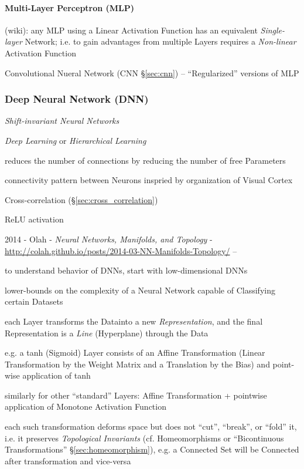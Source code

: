 \paragraph{Multi-Layer Perceptron (MLP)}\label{sec:mlp}\hfill

(wiki): any MLP using a Linear Activation Function has an equivalent
\emph{Single-layer} Network; i.e. to gain advantages from multiple Layers
requires a \emph{Non-linear} Activation Function

\fist Convolutional Nueral Network (CNN \S\ref{sec:cnn}) -- ``Regularized''
versions of MLP



\subsubsection{Deep Neural Network (DNN)}\label{sec:dnn}

\emph{Shift-invariant Neural Networks}

\emph{Deep Learning} or \emph{Hierarchical Learning}

reduces the number of connections by reducing the number of free Parameters

connectivity pattern between Neurons inspried by organization of Visual Cortex

Cross-correlation (\S\ref{sec:cross_correlation})

ReLU activation

\asterism

2014 - Olah - \emph{Neural Networks, Manifolds, and Topology} -
\url{http://colah.github.io/posts/2014-03-NN-Manifolds-Topology/} --

to understand behavior of DNNs, start with low-dimensional DNNs

lower-bounds on the complexity of a Neural Network capable of Classifying
certain Datasets

each Layer transforms the Datainto a new \emph{Representation}, and the
final Representation is a \emph{Line} (Hyperplane) through the Data

e.g. a tanh (Sigmoid) Layer consists of an Affine Transformation (Linear
Transformation by the Weight Matrix and a Translation by the Bias) and
point-wise application of tanh

similarly for other ``standard'' Layers: Affine Transformation + pointwise
application of Monotone Activation Function

each such transformation deforms space but does not ``cut'', ``break'', or
``fold'' it, i.e. it preserves \emph{Topological Invariants} (cf. Homeomorphisms
or ``Bicontinuous Transformations'' \S\ref{sec:homeomorphism}), e.g. a Connected
Set will be Connected after transformation and vice-versa

